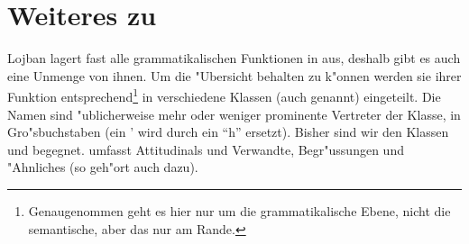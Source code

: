 \section{Weiteres zu }
Lojban lagert fast alle grammatikalischen Funktionen in  aus, deshalb gibt es auch eine Unmenge von ihnen. Um die "Ubersicht behalten zu k"onnen werden sie ihrer Funktion entsprechend\footnote{Genaugenommen geht es hier nur um die grammatikalische Ebene, nicht die semantische, aber das nur am Rande.}
in verschiedene Klassen (auch  genannt) eingeteilt. Die Namen sind "ublicherweise mehr oder weniger prominente Vertreter der Klasse, in Gro"sbuchstaben (ein ' wird durch ein ``h'' ersetzt).
Bisher sind wir den Klassen  und  begegnet.  umfasst Attitudinals und Verwandte,  Begr"ussungen und "Ahnliches (so geh"ort  auch dazu).
